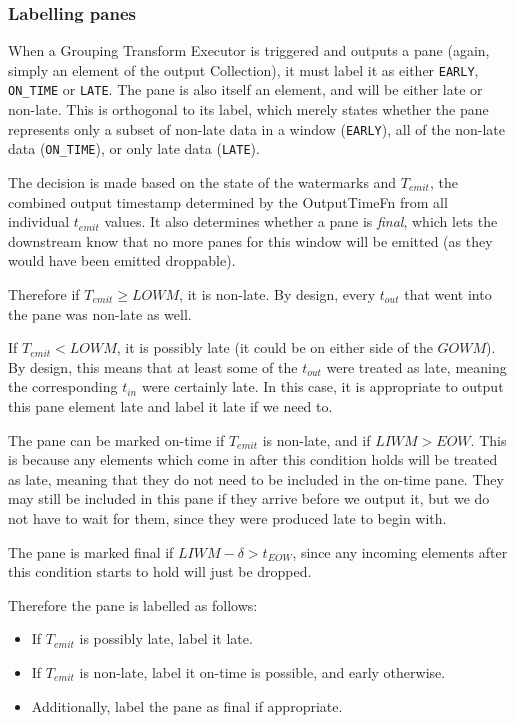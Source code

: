 \subsubsection{Labelling panes}

When a Grouping Transform Executor is triggered and outputs a pane (again, simply an element of the output Collection), it must label it as either \verb|EARLY|, \verb|ON_TIME| or \verb|LATE|.
The pane is also itself an element, and will be either late or non-late.
This is orthogonal to its label, which merely states whether the pane represents only a subset of non-late data in a window (\verb|EARLY|), all of the non-late data (\verb|ON_TIME|), or only late data (\verb|LATE|).

The decision is made based on the state of the watermarks and $T_{\mathit{emit}}$, the combined output timestamp determined by the OutputTimeFn from all individual $t_{\mathit{emit}}$ values.
It also determines whether a pane is \emph{final}, which lets the downstream know that no more panes for this window will be emitted (as they would have been emitted droppable).


Therefore if $T_{\mathit{emit}} \geq \mathit{LOWM}$, it is non-late.
By design, every $t_{\mathit{out}}$ that went into the pane was non-late as well.

If $T_{\mathit{emit}} < \mathit{LOWM}$, it is possibly late (it could be on either side of the $\mathit{GOWM}$).
By design, this means that at least some of the $t_{\mathit{out}}$ were treated as late, meaning the corresponding $t_{\mathit{in}}$ were certainly late.
In this case, it is appropriate to output this pane element late and label it late if we need to.

The pane can be marked on-time if $T_{\mathit{emit}}$ is non-late, and if $\mathit{LIWM} > EOW$.
This is because any elements which come in after this condition holds will be treated as late, meaning that they do not need to be included in the on-time pane.
They may still be included in this pane if they arrive before we output it, but we do not have to wait for them, since they were produced late to begin with.

The pane is marked final if $\mathit{LIWM} - \delta > t_{\mathit{EOW}}$, since any incoming elements after this condition starts to hold will just be dropped.

Therefore the pane is labelled as follows:
\begin{itemize}
	\item If $T_{\mathit{emit}}$ is possibly late, label it late.
	\item If $T_{\mathit{emit}}$ is non-late, label it on-time is possible, and early otherwise.
	\item Additionally, label the pane as final if appropriate.
\end{itemize}

